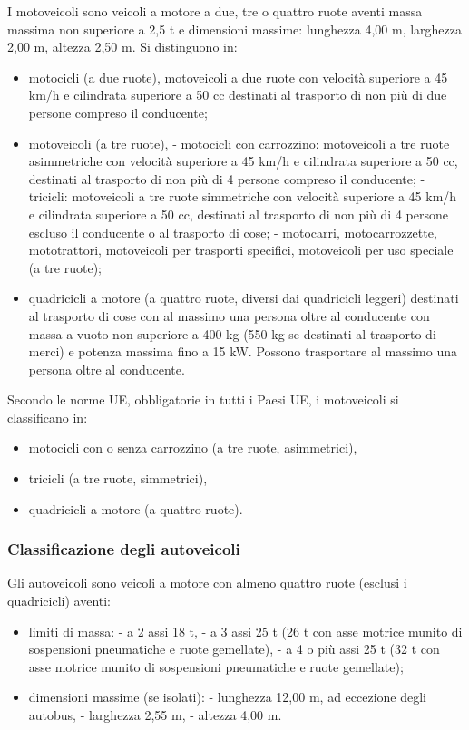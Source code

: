 	      I motoveicoli sono veicoli a motore a due, tre o quattro ruote aventi massa massima non superiore a 2,5 t e dimensioni massime: lunghezza 4,00 m, larghezza 2,00 m, altezza 2,50 m. Si distinguono in:
	      \begin{itemize}
	      	\item motocicli (a due ruote), motoveicoli a due ruote con velocità superiore a 45 km/h e cilindrata superiore a 50 cc destinati al trasporto di non più di due persone compreso il conducente;
	      	\item motoveicoli (a tre ruote),
	      	      - motocicli con carrozzino: motoveicoli a tre ruote asimmetriche con velocità superiore a 45 km/h e cilindrata superiore a 50 cc, destinati al trasporto di non più di 4 persone compreso il conducente;
	      	      - tricicli: motoveicoli a tre ruote simmetriche con velocità superiore a 45 km/h e cilindrata superiore a 50 cc, destinati al trasporto di non più di 4 persone escluso il conducente o al trasporto di cose;
	      	      - motocarri, motocarrozzette, mototrattori, motoveicoli per trasporti specifici, motoveicoli per uso speciale (a tre ruote);
	      	      
	      	\item quadricicli a motore (a quattro ruote, diversi dai quadricicli leggeri) destinati al trasporto di cose con al massimo una persona oltre al conducente con massa a vuoto non superiore a 400 kg (550 kg se destinati al trasporto di merci) e potenza massima fino a 15 kW. Possono trasportare al massimo una persona oltre al conducente.
	      	      
	      \end{itemize}
	      Secondo le norme UE, obbligatorie in tutti i Paesi UE, i motoveicoli si classificano in:
	      \begin{itemize}
	      	\item motocicli con o senza carrozzino (a tre ruote, asimmetrici),
	      	\item tricicli (a tre ruote, simmetrici),
	      	\item quadricicli a motore (a quattro ruote).
	      \end{itemize}
	      
	      
	      \subsubsection{Classificazione degli autoveicoli}
	      Gli autoveicoli sono veicoli a motore con almeno quattro ruote (esclusi i quadricicli) aventi:
	      \begin{itemize}
	      	\item limiti di massa:
	      	      - a 2 assi 18 t,
	      	      - a 3 assi 25 t (26 t con asse motrice munito di sospensioni pneumatiche e ruote gemellate),
	      	      - a 4 o più assi 25 t (32 t con asse motrice munito di sospensioni pneumatiche e ruote gemellate);
	      	\item dimensioni massime (se isolati):
	      	      - lunghezza 12,00 m, ad eccezione degli autobus,
	      	      - larghezza 2,55 m,
	      	      - altezza 4,00 m.
	      \end{itemize}
	      
